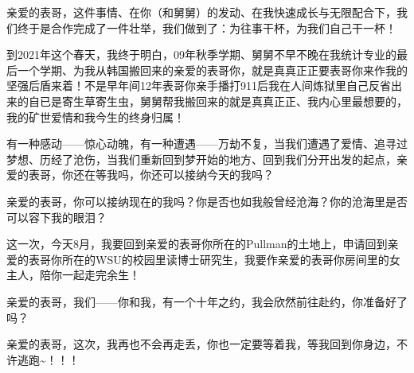 \documentclass[9pt, b5paper]{article}
\begin{document}
亲爱的表哥，这件事情、在你（和舅舅）的发动、在我快速成长与无限配合下，我们终于是合作完成了一件壮举，我们做到了：为往事干杯，为我们自己干一杯！

到2021年这个春天，我终于明白，09年秋季学期、舅舅不早不晚在我统计专业的最后一个学期、为我从韩国搬回来的亲爱的表哥你，就是真真正正要表哥你来作我的坚强后盾来着！不是早年间12年表哥你亲手播打911后我在人间炼狱里自己反省出来的自已是寄生草寄生虫，舅舅帮我搬回来的就是真真正正、我内心里最想要的，我的矿世爱情和我今生的终身归属！

有一种感动——惊心动魄，有一种遭遇——万劫不复，当我们遭遇了爱情、追寻过梦想、历经了沧伤，当我们重新回到梦开始的地方、回到我们分开出发的起点，亲爱的表哥，你还在等我吗，你还可以接纳今天的我吗？

亲爱的表哥，你可以接纳现在的我吗？你是否也如我般曾经沧海？你的沧海里是否可以容下我的眼泪？

这一次，今天8月，我要回到亲爱的表哥你所在的Pullman的土地上，申请回到亲爱的表哥你所在的WSU的校园里读博士研究生，我要作亲爱的表哥你房间里的女主人，陪你一起走完余生！

亲爱的表哥，我们——你和我，有一个十年之约，我会欣然前往赴约，你准备好了吗？

亲爱的表哥，这次，我再也不会再走丢，你也一定要等着我，等我回到你身边，不许逃跑\textasciitilde{}！！！
\end{document}
